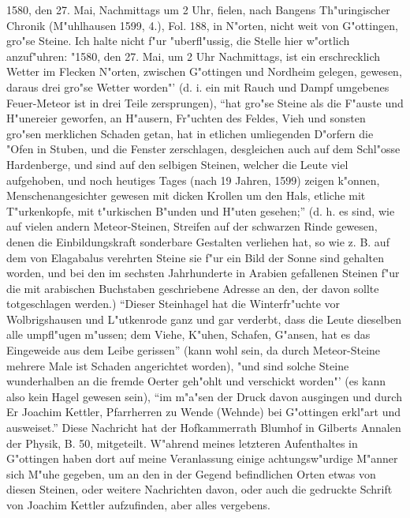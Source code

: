 \documentclass[a4paper, 11pt, oneside, polutonikogreek, german]{article}
\begin{document}
1580, den 27. Mai, Nachmittags um 2 Uhr, fielen, nach Bangens Th"uringischer Chronik (M"uhlhausen 1599, 4.), Fol. 188, in N"orten, nicht weit von G"ottingen, gro"se Steine. Ich halte nicht f"ur "uberfl"ussig, die Stelle hier w"ortlich anzuf"uhren: "1580, den 27. Mai, um 2 Uhr Nachmittags, ist ein erschrecklich Wetter im Flecken N"orten, zwischen G"ottingen und Nordheim gelegen, gewesen, daraus drei gro"se Wetter worden"' (d. i. ein mit Rauch und Dampf umgebenes Feuer-Meteor ist in drei Teile zersprungen), "`hat gro"se Steine als die F"auste und H"unereier geworfen, an H"ausern, Fr"uchten des Feldes, Vieh und sonsten gro"sen merklichen Schaden getan, hat in etlichen umliegenden D"orfern die "Ofen in Stuben, und die Fenster zerschlagen, desgleichen auch auf dem Schl"osse Hardenberge, und sind auf den selbigen Steinen, welcher die Leute viel aufgehoben, und noch heutiges Tages (nach 19 Jahren, 1599) zeigen k"onnen, Menschenangesichter gewesen mit dicken Krollen um den Hals, etliche mit T"urkenkopfe, mit t"urkischen B"unden und H"uten gesehen;"' (d. h. es sind, wie auf vielen andern Meteor-Steinen, Streifen auf der schwarzen Rinde gewesen, denen die Einbildungskraft sonderbare Gestalten verliehen hat, so wie z. B. auf dem von Elagabalus verehrten Steine sie f"ur ein Bild der Sonne sind gehalten worden, und bei den im sechsten Jahrhunderte in Arabien gefallenen Steinen f"ur die mit arabischen Buchstaben geschriebene Adresse an den, der davon sollte totgeschlagen werden.) "`Dieser Steinhagel hat die Winterfr"uchte vor Wolbrigshausen und L"utkenrode ganz und gar verderbt, dass die Leute dieselben alle umpfl"ugen m"ussen; dem Viehe, K"uhen, Schafen, G"ansen, hat es das Eingeweide aus dem Leibe gerissen"' (kann wohl sein, da durch Meteor-Steine mehrere Male ist Schaden angerichtet worden), "und sind solche Steine wunderhalben an die fremde Oerter geh"ohlt und verschickt worden"' (es kann also kein Hagel gewesen sein), "`im m"a"sen der Druck davon ausgingen und durch Er Joachim Kettler, Pfarrherren zu Wende (Wehnde) bei G"ottingen erkl"art und ausweiset."' Diese Nachricht hat der Hofkammerrath Blumhof in Gilberts Annalen der Physik, B. 50, mitgeteilt. W"ahrend meines letzteren Aufenthaltes in G"ottingen haben dort auf meine Veranlassung einige achtungsw"urdige M"anner sich M"uhe gegeben, um an den in der Gegend befindlichen Orten etwas von diesen Steinen, oder weitere Nachrichten davon, oder auch die gedruckte Schrift von Joachim Kettler aufzufinden, aber alles vergebens.
\end{document}
